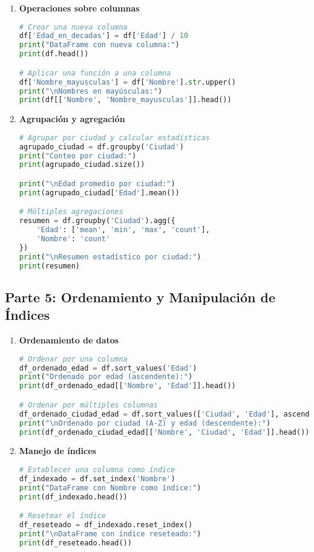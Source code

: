 \documentclass[a4paper,12pt]{article}
\begin{document}
\begin{enumerate}
    \item \textbf{Operaciones sobre columnas}
    \begin{lstlisting}[language=Python]
# Crear una nueva columna
df['Edad_en_decadas'] = df['Edad'] / 10
print("DataFrame con nueva columna:")
print(df.head())

# Aplicar una función a una columna
df['Nombre_mayusculas'] = df['Nombre'].str.upper()
print("\nNombres en mayúsculas:")
print(df[['Nombre', 'Nombre_mayusculas']].head())
    \end{lstlisting}

    \item \textbf{Agrupación y agregación}
    \begin{lstlisting}[language=Python]
# Agrupar por ciudad y calcular estadísticas
agrupado_ciudad = df.groupby('Ciudad')
print("Conteo por ciudad:")
print(agrupado_ciudad.size())

print("\nEdad promedio por ciudad:")
print(agrupado_ciudad['Edad'].mean())

# Múltiples agregaciones
resumen = df.groupby('Ciudad').agg({
    'Edad': ['mean', 'min', 'max', 'count'],
    'Nombre': 'count'
})
print("\nResumen estadístico por ciudad:")
print(resumen)
    \end{lstlisting}
\end{enumerate}

\subsection{Parte 5: Ordenamiento y Manipulación de Índices}

\begin{enumerate}
    \item \textbf{Ordenamiento de datos}
    \begin{lstlisting}[language=Python]
# Ordenar por una columna
df_ordenado_edad = df.sort_values('Edad')
print("Ordenado por edad (ascendente):")
print(df_ordenado_edad[['Nombre', 'Edad']].head())

# Ordenar por múltiples columnas
df_ordenado_ciudad_edad = df.sort_values(['Ciudad', 'Edad'], ascending=[True, False])
print("\nOrdenado por ciudad (A-Z) y edad (descendente):")
print(df_ordenado_ciudad_edad[['Nombre', 'Ciudad', 'Edad']].head())
    \end{lstlisting}

    \item \textbf{Manejo de índices}
    \begin{lstlisting}[language=Python]
# Establecer una columna como índice
df_indexado = df.set_index('Nombre')
print("DataFrame con Nombre como índice:")
print(df_indexado.head())

# Resetear el índice
df_reseteado = df_indexado.reset_index()
print("\nDataFrame con índice reseteado:")
print(df_reseteado.head())
    \end{lstlisting}
\end{enumerate}
\end{document}
